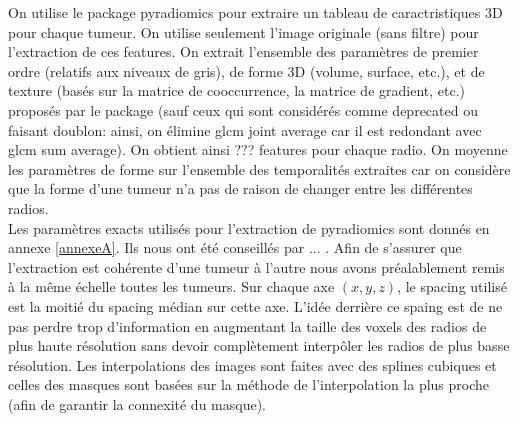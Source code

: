 \documentclass[10pt]{article}
\begin{document}
On utilise le package pyradiomics \cite{pyradio} pour extraire un tableau de caractristiques 3D pour chaque tumeur. On utilise seulement l'image originale (sans filtre) pour l'extraction de ces features. On extrait l'ensemble des paramètres de premier ordre (relatifs aux niveaux de gris), de forme 3D (volume, surface, etc.), et de texture (basés sur la matrice de cooccurrence, la matrice de gradient, etc.) proposés par le package (sauf ceux qui sont considérés comme deprecated ou faisant doublon: ainsi, on élimine glcm joint average car il est redondant avec glcm sum average). On obtient ainsi ??? features pour chaque radio. On moyenne les paramètres de forme sur l'ensemble des temporalités extraites car on considère que la forme d'une tumeur n'a pas de raison de changer entre les différentes radios.\\
\indent Les paramètres exacts utilisés pour l'extraction de pyradiomics sont donnés en annexe \ref{annexeA}. Ils nous ont été conseillés par ... . Afin de s'assurer que l'extraction est cohérente d'une tumeur à l'autre nous avons préalablement remis à la même échelle toutes les tumeurs. Sur chaque axe $(x,y,z)$, le spacing utilisé est la moitié du spacing médian sur cette axe. L'idée derrière ce spaing est de ne pas perdre trop d'information en augmentant la taille des voxels des radios de plus haute résolution sans devoir complètement interpôler les radios de plus basse résolution. Les interpolations des images sont faites avec des splines cubiques et celles des masques sont basées sur la méthode de l'interpolation la plus proche (afin de garantir la connexité du masque).\\
\end{document}
